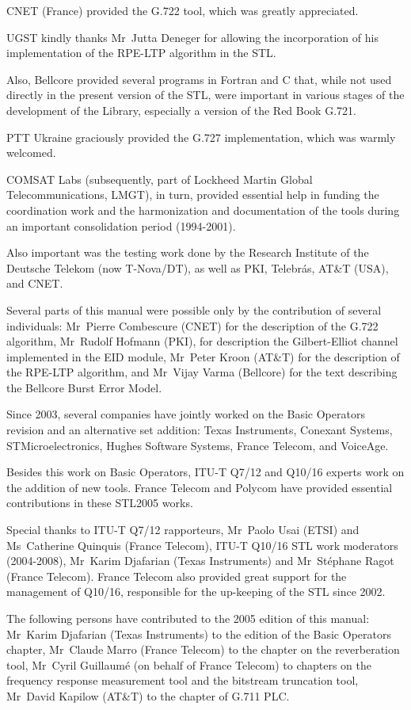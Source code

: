 CNET (France) provided the G.722 tool, which was greatly appreciated.

UGST kindly thanks Mr~Jutta Deneger for allowing the incorporation of his implementation of the RPE-LTP algorithm in the STL.

Also, Bellcore provided several programs in Fortran and C that, while not used directly in the present version of the STL, were important in various stages of the development of the Library, especially a version of the Red Book G.721.

PTT Ukraine graciously provided the G.727 implementation, which was warmly welcomed.

COMSAT Labs (subsequently, part of Lockheed Martin Global Telecommunications, LMGT), in turn, provided essential help in funding the coordination work and the harmonization and documentation of the tools during an important consolidation period (1994-2001).

Also important was the testing work done by the Research Institute of the Deutsche Telekom (now T-Nova/DT), as well as PKI, Telebr\'{a}s, AT\&T (USA), and CNET.

Several parts of this manual were possible only by the contribution of several individuals: Mr~Pierre Combescure (CNET) for the description of the G.722 algorithm, Mr~Rudolf Hofmann (PKI), for description the Gilbert-Elliot channel implemented in the EID module, Mr~Peter Kroon (AT\&T) for the description of the RPE-LTP algorithm, and Mr~Vijay Varma (Bellcore) for the text describing the Bellcore Burst Error Model.

Since 2003, several companies have jointly worked on the Basic Operators revision and an alternative set addition: Texas Instruments, Conexant Systems, STMicroelectronics, Hughes Software Systems, France Telecom, and VoiceAge.

Besides this work on Basic Operators, ITU-T Q7/12 and Q10/16 experts work on the addition of new tools.
France Telecom and Polycom have provided essential contributions in these STL2005 works.

Special thanks to ITU-T Q7/12 rapporteurs, Mr~Paolo Usai (ETSI) and Ms~Catherine Quinquis (France Telecom), ITU-T Q10/16 STL work moderators (2004-2008), Mr~Karim Djafarian (Texas Instruments) and Mr~St\'{e}phane Ragot (France Telecom).
France Telecom also provided great support for the management of Q10/16, responsible for the up-keeping of the STL since 2002.

The following persons have contributed to the 2005 edition of this manual: Mr~Karim Djafarian (Texas Instruments) to the edition of the Basic Operators chapter, Mr~Claude Marro (France Telecom) to the chapter on the reverberation tool, Mr~Cyril Guillaum\'{e} (on behalf of France Telecom) to chapters on the frequency response measurement tool and the bitstream truncation tool, Mr~David Kapilow (AT\&T) to the chapter of G.711 PLC.

